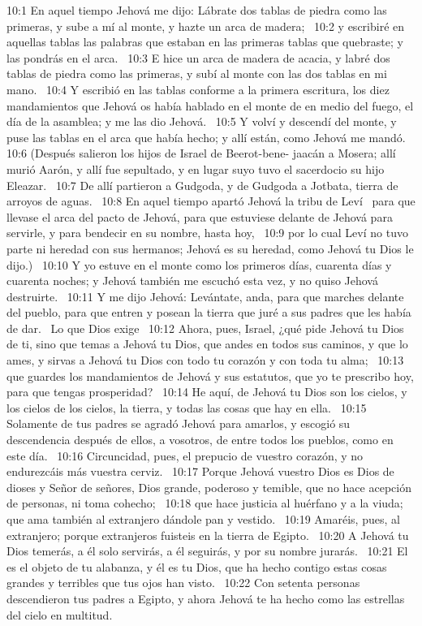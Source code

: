 10:1 En aquel tiempo Jehová me dijo: Lábrate dos tablas de piedra como las primeras, y sube a mí al monte, y hazte un arca de madera;  
10:2 y escribiré en aquellas tablas las palabras que estaban en las primeras tablas que quebraste; y las pondrás en el arca.  
10:3 E hice un arca de madera de acacia, y labré dos tablas de piedra como las primeras, y subí al monte con las dos tablas en mi mano.  
10:4 Y escribió en las tablas conforme a la primera escritura, los diez mandamientos que Jehová os había hablado en el monte de en medio del fuego, el día de la asamblea; y me las dio Jehová.  
10:5 Y volví y descendí del monte, y puse las tablas en el arca que había hecho; y allí están, como Jehová me mandó.  
10:6 (Después salieron los hijos de Israel de Beerot-bene- jaacán a Mosera; allí murió Aarón, y allí fue sepultado, y en lugar suyo tuvo el sacerdocio su hijo Eleazar.  
10:7 De allí partieron a Gudgoda, y de Gudgoda a Jotbata, tierra de arroyos de aguas.  
10:8 En aquel tiempo apartó Jehová la tribu de Leví  para que llevase el arca del pacto de Jehová, para que estuviese delante de Jehová para servirle, y para bendecir en su nombre, hasta hoy,  
10:9 por lo cual Leví no tuvo parte ni heredad con sus hermanos; Jehová es su heredad, como Jehová tu Dios le dijo.)  
10:10 Y yo estuve en el monte como los primeros días, cuarenta días y cuarenta noches; y Jehová también me escuchó esta vez, y no quiso Jehová destruirte.  
10:11 Y me dijo Jehová: Levántate, anda, para que marches delante del pueblo, para que entren y posean la tierra que juré a sus padres que les había de dar.  
Lo que Dios exige  
10:12 Ahora, pues, Israel, ¿qué pide Jehová tu Dios de ti, sino que temas a Jehová tu Dios, que andes en todos sus caminos, y que lo ames, y sirvas a Jehová tu Dios con todo tu corazón y con toda tu alma;  
10:13 que guardes los mandamientos de Jehová y sus estatutos, que yo te prescribo hoy, para que tengas prosperidad?  
10:14 He aquí, de Jehová tu Dios son los cielos, y los cielos de los cielos, la tierra, y todas las cosas que hay en ella.  
10:15 Solamente de tus padres se agradó Jehová para amarlos, y escogió su descendencia después de ellos, a vosotros, de entre todos los pueblos, como en este día.  
10:16 Circuncidad, pues, el prepucio de vuestro corazón, y no endurezcáis más vuestra cerviz.  
10:17 Porque Jehová vuestro Dios es Dios de dioses y Señor de señores, Dios grande, poderoso y temible, que no hace acepción de personas, ni toma cohecho;  
10:18 que hace justicia al huérfano y a la viuda; que ama también al extranjero dándole pan y vestido.  
10:19 Amaréis, pues, al extranjero; porque extranjeros fuisteis en la tierra de Egipto.  
10:20 A Jehová tu Dios temerás, a él solo servirás, a él seguirás, y por su nombre jurarás.  
10:21 El es el objeto de tu alabanza, y él es tu Dios, que ha hecho contigo estas cosas grandes y terribles que tus ojos han visto.  
10:22 Con setenta personas descendieron tus padres a Egipto, y ahora Jehová te ha hecho como las estrellas del cielo en multitud.  
